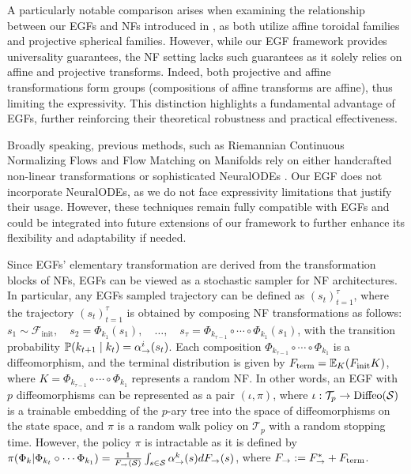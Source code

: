 \documentclass{article}
\theoremstyle{plain}
\theoremstyle{definition}
\theoremstyle{remark}
\theoremstyle{fact}
\begin{document}
A particularly notable comparison arises when examining the relationship between our EGFs and NFs introduced in  \citet{rezende2020normalizing}, as both utilize affine toroidal families and projective spherical families. However, while our EGF framework provides universality guarantees, the NF setting lacks such guarantees as it solely relies on affine and projective transforms. Indeed, both projective and affine transformations form groups (compositions of affine transforms are affine), thus limiting the expressivity. This distinction highlights a fundamental advantage of EGFs, further reinforcing their theoretical robustness and practical effectiveness. 

Broadly speaking, previous methods, such as Riemannian Continuous Normalizing Flows \cite{mathieu2020riemannian} and Flow Matching on Manifolds \cite{chen2024flow} rely on either handcrafted non-linear transformations or sophisticated NeuralODEs \cite{chen2018neural}. Our EGF does not incorporate NeuralODEs, as we do not face expressivity limitations that justify their usage. However, these techniques remain fully compatible with EGFs and could be integrated into future extensions of our framework to further enhance its flexibility and adaptability if needed.

Since EGFs' elementary transformation are derived from the transformation blocks of NFs, EGFs can be viewed as a stochastic sampler for NF architectures. In particular, any EGFs sampled trajectory can be defined as $(s_t)_{t=1}^\tau$, where the trajectory $(s_t)_{t=1}^\tau$ is obtained by composing NF transformations as follows: $s_1 \sim \mathcal{F}_{\text{init}}, \quad s_2 = \Phi_{k_1}(s_1), \quad \dots, \quad s_\tau = \Phi_{k_{\tau-1}} \circ \cdots \circ \Phi_{k_1}(s_1)$,  
with the transition probability $\mathbb{P}(k_{t+1} \mid k_t) = \alpha_{\rightarrow}^i(s_t)$. Each composition $\Phi_{k_{\tau-1}} \circ \cdots \circ \Phi_{k_1}$ is a diffeomorphism, and the terminal distribution is given by $F_{\mathrm{term}}=\mathbb E_K(F_{\mathrm{init}} K)$, where $K=\Phi_{k_{\tau-1}} \circ \cdots \circ \Phi_{k_1}$ represents a random NF.
In other words, an EGF with $p$ diffeomorphisms can be represented as a pair $(\iota, \pi)$, where $\iota : \mathcal T_p \rightarrow \mathrm{Diffeo}(\mathcal S)$ is a trainable embedding of the $p$-ary tree into the space of diffeomorphisms on the state space, and $\pi$ is a random walk policy on $\mathcal T_p$ with a random stopping time.
However, the policy $\pi$ is intractable as it is defined by $\pi(\Phi_{k} | \Phi_{k_t}\circ \cdots \Phi_{k_1}) = \frac{1}{F_{\rightarrow}(\mathcal S)}\int_{s\in\mathcal S} \alpha_{\rightarrow}^k(s)dF_{\rightarrow}(s)$, where $F_{\rightarrow} := F^*_{\rightarrow} + F_{\mathrm{term}}$.
\end{document}
